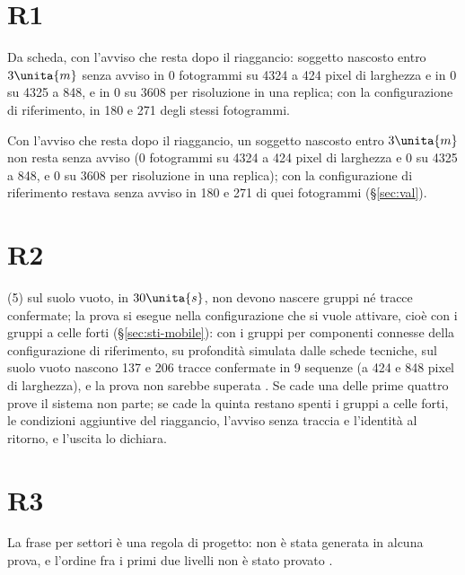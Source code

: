 

\section*{R1}
Da scheda, con l'avviso che resta dopo il riaggancio: soggetto nascosto entro $3\unita{m}$ senza avviso in 0 fotogrammi su 4324 a 424 pixel di larghezza e in 0 su 4325 a 848, e in 0 su 3608 per risoluzione in una replica; con la configurazione di riferimento, in 180 e 271 degli stessi fotogrammi.

Con l'avviso che resta dopo il riaggancio, un soggetto nascosto entro $3\unita{m}$ non resta senza avviso (0 fotogrammi su 4324 a 424 pixel di larghezza e 0 su 4325 a 848, e 0 su 3608 per risoluzione in una replica); con la configurazione di riferimento restava senza avviso in 180 e 271 di quei fotogrammi (\S\ref{sec:val}).
\section*{R2}
(5) sul suolo vuoto, in $30\unita{s}$, non devono nascere gruppi né tracce confermate; la prova si esegue nella configurazione che si vuole attivare, cioè con i gruppi a celle forti (\S\ref{sec:sti-mobile}): con i gruppi per componenti connesse della configurazione di riferimento, su profondità simulata dalle schede tecniche, sul suolo vuoto nascono 137 e 206 tracce confermate in 9 sequenze (a 424 e 848 pixel di larghezza), e la prova non sarebbe superata . Se cade una delle prime quattro prove il sistema non parte; se cade la quinta restano spenti i gruppi a celle forti, le condizioni aggiuntive del riaggancio, l'avviso senza traccia e l'identità al ritorno, e l'uscita lo dichiara.
\section*{R3}
La frase per settori è una regola di progetto: non è stata generata in alcuna prova, e l'ordine fra i primi due livelli non è stato provato .

